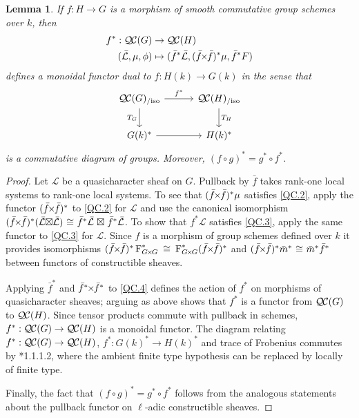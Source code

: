 \documentclass[CM,Submssn,SecEq]{degruyter-crelle} %
\theoremstyle{plain}
\newtheorem{lemma}[theorem]{Lemma}
\theoremstyle{definition}
\theoremstyle{remark}
\newcommand{\Fq}{k}
\newcommand{\Frob}[1]{\operatorname{F}_{#1}}
\newcommand{\iso}{{\ \cong\ }}
\newcommand{\TrFrob}[1]{T_{#1}}
\newcommand{\qcs}[1]{{\mathcal{#1}}}
\newcommand{\gqcs}[1]{{\mathcal{\bar #1}}}
\newcommand{\QC}{{\mathcal{Q\hskip-0.8pt C}}}
\newcommand{\QCiso}[1]{\QC(#1)_{/\text{iso}}}
\renewcommand{\bf}{\bar{f}}
\newcommand{\bm}{\bar{m}}
\newcommand{\tight}[3]{\hspace{-#1pt}{#2}\hspace{-#3pt}}
\newcommand{\bfxf}{\text{$\bar{f} \tight{1}{\times}{1} \bar{f}$}}
\newcommand{\GxxG}{\text{$G \tight{1}{\times}{1} G$}}
\newcommand{\LxL}{\text{$\gqcs{L} \tight{0}{\boxtimes}{0} \gqcs{L}$}}
\begin{document}
\begin{lemma}\label{lem:pullback}
  If $f : H\to G$ is a morphism of smooth commutative group schemes over $\Fq$, then
  \begin{align*}
  f^* : \QC(G) &\to \QC(H) \\
  (\gqcs{L},\mu,\phi) &\mapsto (\bf^*\gqcs{L},(\bfxf)^*\mu,\bf^*F)
  \end{align*}
  defines a monoidal functor dual to $f \colon H(\Fq) \to G(\Fq)$ in the sense that
  \[
  \begin{tikzcd}[row sep=20, column sep=30]
   \QCiso{G} \rar{f^*} \arrow[swap]{d}{\TrFrob{G}} & \QCiso{H} \dar{\TrFrob{H}} \\
   G(\Fq)^* \rar & H(\Fq)^*
  \end{tikzcd}
  \]
  is a commutative diagram of groups.  Moreover, $(f\circ g)^* = g^* \circ f^*$.
\end{lemma}
\begin{proof}
  Let $\qcs{L}$ be a quasicharacter sheaf on $G$. 
  Pullback by $\bf$ takes rank-one local systems to rank-one local systems.
  To see that $(\bfxf)^* \mu$ satisfies \ref{QC.2},
  apply the functor $(\bfxf)^*$
  to \ref{QC.2} for $\qcs{L}$ and use the canonical isomorphism
  $(\bfxf)^*(\LxL) \iso \bf^*\gqcs{L} \tight{-3}{\boxtimes}{-3} \bf^*\gqcs{L}$.
  To show that $f^*\qcs{L}$ satisfies
  \ref{QC.3}, apply the same functor to \ref{QC.3} for $\qcs{L}$.
  Since $f$ is a morphism of group schemes defined over $\Fq$
  it provides isomorphisms $(\bfxf)^*\Frob{\GxxG}^* \iso \Frob{\GxxG}^* (\bfxf)^*$
  and $(\bfxf)^* \bm^*\iso \bm^* \bf^*$ between functors of constructible sheaves.

  Applying $\bf^*$ and $\bf^* \tight{1}{\times}{1}\bf^*$ to \ref{QC.4} defines the action
  of $f^*$ on morphisms of quasicharacter sheaves; arguing as above shows that $f^*$ is
  a functor from $\QC(G)$ to $\QC(H)$.  Since tensor products commute with pullback in schemes,
  $f^* : \QC(G) \to \QC(H)$ is a monoidal functor.
  The diagram relating $f^* : \QC(G) \to \QC(H)$, $f^* : G(k)^* \to H(k)^*$ and trace of Frobenius
  commutes by \cite{laumon:87a}*{1.1.1.2}, where the ambient
 finite type hypothesis can be replaced by locally of finite type.

  Finally, the fact that $(f\circ g)^* = g^* \circ f^*$ follows from the analogous
  statements about the pullback functor on $\ell$-adic constructible sheaves.
\end{proof}

\end{document}
